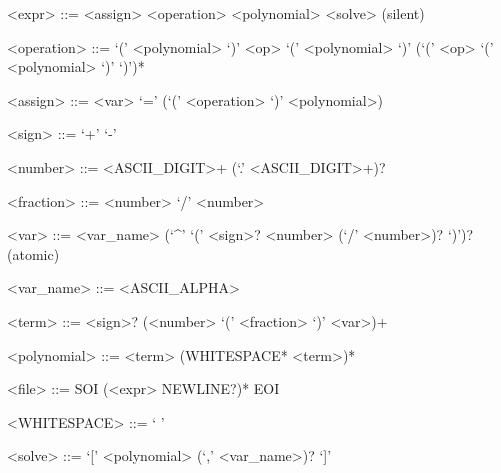 
\begin{minipage}{\linewidth}
    \begin{grammar}
        <expr> ::= <assign> \alt <operation> \alt <polynomial> \alt <solve> \hfill{(silent)}

        <operation> ::= `(' <polynomial> `)' <op> `(' <polynomial> `)' (`(' <op> `(' <polynomial> `)' `)')*

        <assign> ::= <var> `=' (`(' <operation> `)' \alt <polynomial>)
        
        <sign> ::= `+' \alt `-'
        
        <number> ::= <ASCII_DIGIT>+ (`.' <ASCII_DIGIT>+)?
        
        <fraction> ::= <number> `/' <number>
        
        <var> ::= <var_name> (`^' `(' <sign>? <number> (`/' <number>)? `)')? \hfill{(atomic)}
        
        <var\_name> ::= <ASCII_ALPHA>
        
        <term> ::= <sign>? (<number> \alt `(' <fraction> `)' \alt <var>)+
        
        <polynomial> ::= <term> (WHITESPACE* <term>)*
        
        <file> ::= SOI (<expr> NEWLINE?)* EOI
        
        <WHITESPACE> ::= ` '
        
        <solve> ::= `[' <polynomial> (`,' <var_name>)? `]'
    \end{grammar}
\end{minipage}

